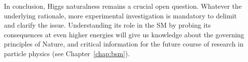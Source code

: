 \documentclass[../report.tex]{subfiles}
\begin{document}
  In conclusion, Higgs naturalness remains a crucial open question. Whatever the underlying rationale,  more experimental investigation is mandatory to delimit and 
  clarify the issue. Understanding its role in the SM by probing its consequences at even higher energies will give us knowledge about the governing principles of Nature, and critical information for the future course of research in particle physics (see Chapter~\ref{chap:bsm}).



\end{document}
